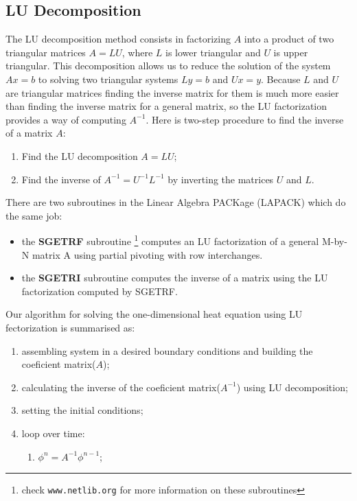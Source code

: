\subsection{LU Decomposition}
The LU decomposition method consists in factorizing $A$ into a product of two triangular matrices $A=LU$, where $L$ is lower triangular and $U$ is upper triangular. This decomposition allows us to reduce the solution of the system $Ax = b$ to solving two triangular systems $Ly = b$ and $Ux = y$. Because $L$ and $U$ are triangular matrices finding the inverse matrix for them is much more easier than finding the inverse matrix for a general matrix, so the LU factorization provides a way of computing $A^{-1}$. Here is two-step procedure to find the inverse of a matrix $A$:
\begin{enumerate}
\item Find the LU decomposition $A = LU$;
\item Find the inverse of $A^{-1} = U^{-1}L^{-1}$ by inverting the matrices $U$ and $L$.
\end{enumerate}
There are two subroutines in the Linear Algebra PACKage (LAPACK) which do the same job:
\begin{itemize}
\item the \textbf{SGETRF} subroutine \footnote{check \texttt{www.netlib.org} for more information on these subroutines} computes an LU factorization of a general M-by-N matrix A using partial pivoting with row interchanges.
\item the \textbf{SGETRI} subroutine computes the inverse of a matrix using the LU factorization computed by SGETRF.
\end{itemize}

Our algorithm for solving the one-dimensional heat equation using LU fectorization is summarised as:
\begin{enumerate} %
\item assembling system in a desired boundary conditions and building the coeficient matrix($A$);
\item calculating the inverse of the coeficient matrix($A^{-1}$) using LU decomposition;
\item setting the initial conditions;
\item loop over time:
	\begin{enumerate}
		\item $\phi^{n} = A^{-1} \phi^{n-1}$;
	\end{enumerate}
\end{enumerate}

